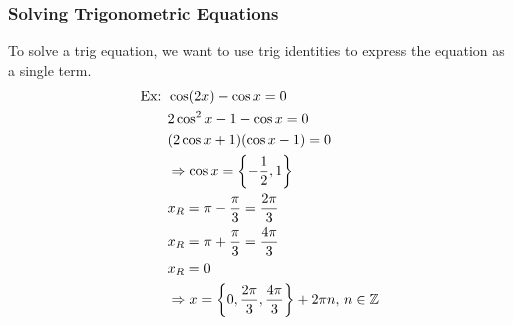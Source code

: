 \documentclass[11pt, fleqn]{article}
\begin{document}
\subsubsection{Solving Trigonometric Equations}
To solve a trig equation, we want to use trig identities to express the equation as a single term.\\
\begin{align*}
    \text{Ex: }&\cos(2x)-\cos x=0\\
    &2\cos^2x-1-\cos x=0\\
    &(2\cos x+1)(\cos x-1)=0\\
    &\Rightarrow\cos x=\left\{-\frac{1}{2},1\right\}\\
    &x_R=\pi-\frac{\pi}{3}=\frac{2\pi}{3}\\
    &x_R=\pi+\frac{\pi}{3}=\frac{4\pi}{3}\\
    &x_R=0\\
    &\Rightarrow x=\left\{0,\frac{2\pi}{3},\frac{4\pi}{3}\right\}+2\pi n,\,n\in\mathbb{Z}
\end{align*}
\end{document}
